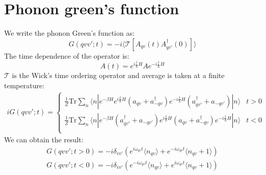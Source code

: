 \documentclass{article}
\begin{document}
\section{Phonon green's function} 
We write the phonon Green's function as:
\begin{equation}
    G(qvv';t) = -i \langle \mathcal{T}[A_{qv}(t)A_{qv'}^{\dagger}(0)] \rangle \label{green_phonon}
\end{equation}
The time dependence of the operator is:
\begin{equation}
    A(t) = e^{i\frac{t}{\hbar}H} A e^{-i\frac{t}{\hbar}H}
\end{equation}
$\mathcal{T}$ is the Wick's time ordering operator and average is taken at a finite temperature:
\begin{align}
    iG(qvv';t) = 
    \begin{cases} 
        \frac{1}{Z} \text{Tr} \sum_n \langle n | e^{-\beta H} e^{i\frac{t}{\hbar}H} (a_{qv} + a^{\dagger}_{-qv}) e^{-i\frac{t}{\hbar}H} (a^{\dagger}_{qv'} + a_{-qv'}) | n \rangle & t > 0 \\
        \frac{1}{Z} \text{Tr} \sum_n \langle n | e^{-\beta H} (a^{\dagger}_{qv'} + a_{-qv'}) e^{i\frac{t}{\hbar}H} (a_{qv} + a^{\dagger}_{-qv}) e^{-i\frac{t}{\hbar}H} | n \rangle & t < 0 \\
    \end{cases}
\end{align}
We can obtain the result:
\begin{align}
    G(qvv';t > 0) = -i \delta_{vv'}  ( e^{i\omega_{qv}t}\langle n_{qv} \rangle + e^{-i\omega_{qv}t}\langle n_{qv}+1 \rangle ) \\
    G(qvv';t < 0) = -i \delta_{vv'}  ( e^{-i\omega_{qv}t}\langle n_{qv} \rangle + e^{i\omega_{qv}t}\langle n_{qv}+1 \rangle )
\end{align}
\end{document}
